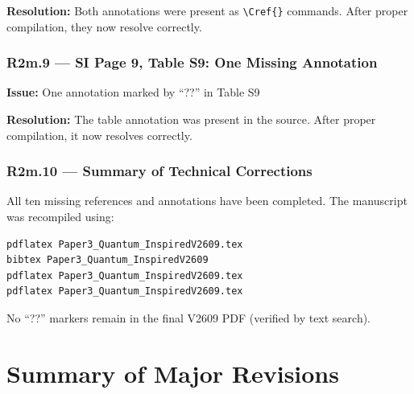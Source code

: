 \documentclass[11pt]{article}
\begin{document}
\textbf{Resolution:}
Both annotations were present as \texttt{\textbackslash Cref\{\}} commands. After proper 
compilation, they now resolve correctly.

\subsubsection*{R2m.9 --- SI Page 9, Table S9: One Missing Annotation}
\textbf{Issue:} One annotation marked by ``??'' in Table S9

\textbf{Resolution:}
The table annotation was present in the source. After proper compilation, it now resolves correctly.

\subsubsection*{R2m.10 --- Summary of Technical Corrections}
All ten missing references and annotations have been completed. The manuscript was 
recompiled using:
\begin{verbatim}
pdflatex Paper3_Quantum_InspiredV2609.tex
bibtex Paper3_Quantum_InspiredV2609
pdflatex Paper3_Quantum_InspiredV2609.tex
pdflatex Paper3_Quantum_InspiredV2609.tex
\end{verbatim}

No ``??'' markers remain in the final V2609 PDF (verified by text search).

\section*{Summary of Major Revisions}
\end{document}
